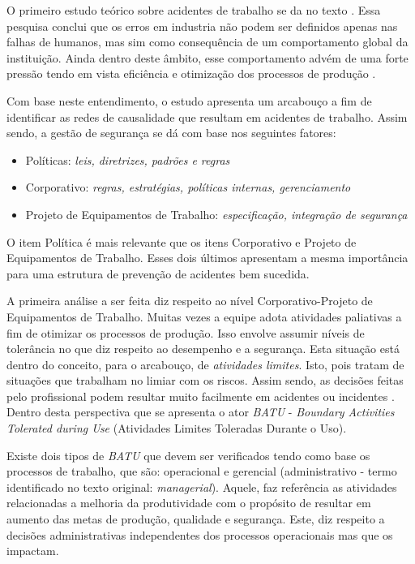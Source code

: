 O primeiro estudo teórico sobre acidentes de trabalho se da no texto \cite{riskoldschool}. Essa pesquisa conclui que os erros em industria não podem ser definidos apenas nas falhas de humanos, mas sim como consequência de um comportamento global da instituição. Ainda dentro deste âmbito, esse comportamento advém de uma forte pressão tendo em vista eficiência e otimização dos processos de produção \cite{riskoldschool} \cite{safety}.

Com base neste entendimento, o estudo \cite{safety} apresenta um arcabouço a fim de identificar as redes de causalidade que resultam em acidentes de trabalho. Assim sendo, a gestão de segurança se dá com base nos seguintes fatores: 
\begin{itemize}
    \item Políticas: \textit{leis, diretrizes, padrões e regras}
    \item Corporativo: \textit{regras, estratégias, políticas internas, gerenciamento}
    \item Projeto de Equipamentos de Trabalho: \textit{especificação, integração de segurança}
\end{itemize}

O item Política é mais relevante que os itens Corporativo e Projeto de Equipamentos de Trabalho. Esses dois últimos apresentam a mesma importância para uma estrutura de prevenção de acidentes 
bem sucedida. 

A primeira análise a ser feita diz respeito ao nível Corporativo-Projeto de Equipamentos de Trabalho. Muitas vezes a equipe adota atividades paliativas a fim de otimizar os processos de produção. Isso envolve assumir níveis de tolerância no que diz respeito ao desempenho e a segurança. Esta situação está dentro do conceito, para o arcabouço, de \textit{atividades limites}. Isto, pois tratam de situações que trabalham no limiar com os riscos. Assim sendo, as decisões feitas pelo profissional podem resultar muito facilmente em acidentes ou incidentes \cite{safety}. Dentro desta perspectiva que se apresenta o ator \textit{BATU} - \textit{Boundary Activities Tolerated during Use} (Atividades Limites Toleradas Durante o Uso).

Existe dois tipos de \textit{BATU} que devem ser verificados tendo como base os processos de trabalho, que são: operacional e gerencial (administrativo - termo identificado no texto original: \textit{managerial}). Aquele, faz referência as atividades relacionadas a melhoria da produtividade com o propósito de resultar em aumento das metas de produção, qualidade e segurança. Este, diz respeito a decisões administrativas independentes dos processos operacionais mas que os impactam.

